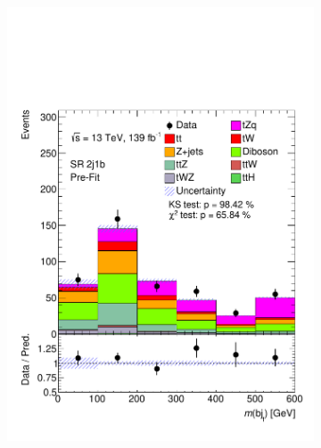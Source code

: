 \begin{figure}[!h] 
  \begin{subfigure}[b]{0.33\linewidth}
    \centering
    \includegraphics[width=\linewidth]{ubonn-thesis/Chapters/Chapters_06/Figure/Input_distribution/SR_2j1b_M_bj.pdf} 
  \end{subfigure}%
  \begin{subfigure}[b]{0.33\linewidth}
    \centering

\end{subfigure}
\end{figure}
